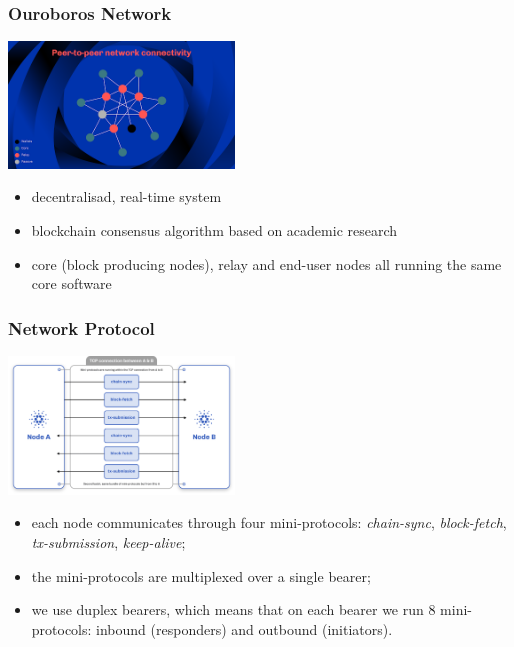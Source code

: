 \documentclass[t,dvipsnames,hyperref={colorlinks,citecolor=NavyBlue,linkcolor=NavyBlue,anchorcolor=NavyBlue,urlcolor=NavyBlue}]{beamer}
\begin{document}
\begin{frame}
  \frametitle{Ouroboros Network}
  \begin{center}
  \includegraphics[width=6cm]{../images/p2p-network.png}
  \end{center}
  \begin{itemize}
    \item[\bullet] decentralisad, real-time system
    \item[\bullet] blockchain consensus algorithm based on academic research
    \item[\bullet] core (block producing nodes), relay and end-user nodes all running
      the same core software
  \end{itemize}
\end{frame}

\begin{frame}
  \frametitle{Network Protocol}
  \begin{center}
  \includegraphics[width=6cm]{../images/node-to-node-ipc.png}
  \end{center}
  \begin{itemize}
    \item[\bullet] each node communicates through four mini-protocols:
      \textit{chain-sync}, \textit{block-fetch}, \textit{tx-submission}, \textit{keep-alive};
    \item[\bullet] the mini-protocols are multiplexed over a single bearer;
    \item[\bullet] we use duplex bearers, which means that on each bearer we
      run 8 mini-protocols: inbound (responders) and outbound (initiators).
  \end{itemize}
\end{frame}

\end{document}

